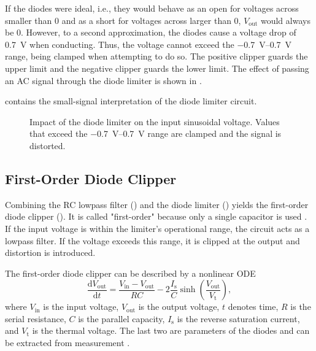 If the diodes were ideal, i.e., they would behave as an open for voltages across smaller than 0 and as a short for voltages across larger than 0, $V_\text{out}$ would always be 0. However, to a second approximation, the diodes cause a voltage drop of \SI{0.7}{V} when conducting. Thus, the voltage cannot exceed the \SIrange{-0.7}{0.7}{V} range, being clamped when attempting to do so. The positive clipper guards the upper limit and the negative clipper guards the lower limit. The effect of passing an \ac{AC} signal through the diode limiter is shown in .

\cite{Yeh2007} contains the small-signal interpretation of the diode limiter circuit.

\begin{figure}
  \centering
  
  \caption{Impact of the diode limiter on the input sinusoidal voltage. Values that exceed the \SIrange{-0.7}{0.7}{V} range are clamped and the signal is distorted.}
  \label{fig:diode_limiter_signal}
\end{figure}


\subsection{First-Order Diode Clipper}
Combining the RC lowpass filter () and the diode limiter () yields the first-order diode clipper (). It is called "first-order" because only a single capacitor is used \cite{Parker2019}. If the input voltage is within the limiter's operational range, the circuit acts as a lowpass filter. If the voltage exceeds this range, it is clipped at the output and distortion is introduced.

The first-order diode clipper can be described by a nonlinear \ac{ODE} \cite{Yeh2007}
\begin{equation}
  \frac{\mathrm{d} V_\text{out}}{\mathrm{d}t} = \frac{V_\text{in} - V_\text{out}}{RC} - 2 \frac{I_\text{s}}{C} \sinh \left(\frac{V_\text{out}}{V_\text{t}}\right),
  \label{eq:diode_clipper_equation}
\end{equation}
where $V_\text{in}$ is the input voltage, $V_\text{out}$ is the output voltage, $t$ denotes time, $R$ is the serial resistance, $C$ is the parallel capacity, $I_\text{s}$ is the reverse saturation current, and $V_\text{t}$ is the thermal voltage. The last two are parameters of the diodes and can be extracted from measurement \cite{Yeh2007}.

